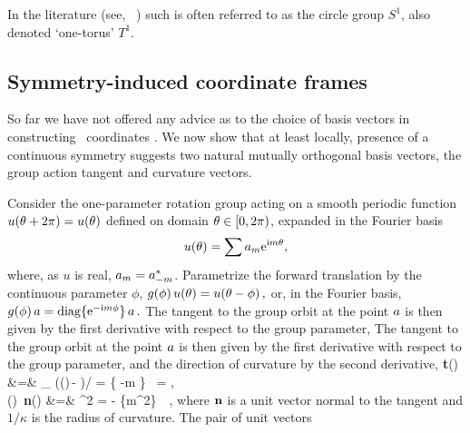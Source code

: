 \documentclass{jfm}
\begin{document}
In the literature
(see, \eg\ \cite{ReSaTkYa11}) such  is often referred to as the
circle group $S^1$, also denoted `one-torus' $T^1$.


\subsection{Symmetry-induced coordinate frames}
\label{s:symm}

So far we have not offered any advice as to the choice of basis vectors
in constructing \statesp\ coordinates . We now show
that at least locally, presence of a continuous symmetry suggests two
natural mutually orthogonal basis vectors, the group action tangent and
curvature vectors.

Consider the one-parameter rotation group  acting on a smooth
periodic function $u({\bf \theta} + 2\pi) = u({\bf \theta})$ defined on domain
${\bf \theta} \in [0,2\pi)$, expanded in the Fourier basis
\[ %
   u(\gSpace) = \sum \ssp_m \mathrm{e}^{\mathrm{i}m\gSpace},
\] %
where, as $u$ is real, $a_m=a_{-m}^*$. Parametrize the forward
translation by the continuous parameter $\phi$,
\(
    g(\phi)\,u({\bf \theta}) = u({\bf \theta}-\phi)
\,,
\)
or, in the Fourier basis,
\(
   g(\phi) \,a = \mathrm{diag}\{ \mathrm{e}^{-\mathrm{i}m\phi} \} \,a
\,.
\)
The tangent to the group orbit at the point $\ssp$ is then given by
the first derivative with respect to the group parameter,
The tangent to the group orbit at the point $\ssp$ is then given by
the first derivative with respect to the group parameter,
and the direction of curvature by the second derivative,
\bea
   {\bf t}(\ssp) &=&
   \lim_{\gSpace{}}
   \left(\LieEl(\gSpace)\,\ssp - \ssp\right)/\gSpace
   = \{ -m \} \, \ssp = \Lg \ssp,
\label{eq:tang}\\
   \kappa(\ssp)\, {\bf n}(\ssp) &=& \Lg^2 \ssp  = - \{m^2\} \, \ssp
   \,,
\label{eq:curv}
\eea
where $\mathbf{n}$ is a unit vector normal to the tangent and
$1/\kappa$ is the radius of curvature. The pair of unit vectors
    \PC{2011-10-28
    ``As $\Norm{\LieEl(\gSpace)\slicep}$ is a constant, for the group tangent
    vector $\Lg_\gSpace \slicep$ evaluated at $\slicep$ \refeq{eq:tang}
    $\braket{\slicep}{\Lg_\theta\,\slicep}$ vanishes ($\Lg_{\theta}$ is
    antisymmetric).''
The state vector $\ssp$ is not normal to \normVec(\ssp), as $\braket{\ssp
\Lg^2}{\ssp} = - \Norm{\groupTan(\ssp)}^2 \neq 0$, but can one use it to
produce from $\ssp$ the 3. local eigenbasis unit vector? Have not thought
that through. If we do that here, need to rewrite text leading to
\refeq{PCsectQ0}.
    }
\end{document}
